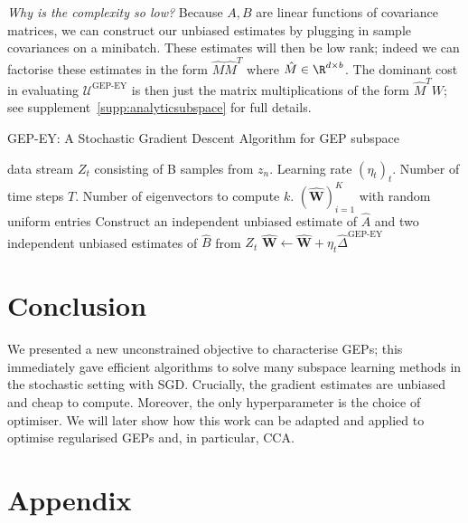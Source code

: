 \textit{Why is the complexity so low?} Because $A,B$ are linear functions of covariance matrices, we can construct our unbiased estimates by plugging in sample covariances on a minibatch.
These estimates will then be low rank; indeed we can factorise these estimates in the form $\hat{M} \hat{M}^T$ where $\hat{M} \in \R^{d \times b}$. The dominant cost in evaluating $\mathcal{U}^\text{GEP-EY}$ is then just the matrix multiplications of the form $\hat{M}^T W$; see supplement~\ref{supp:analyticsubspace} for full details.

\begin{algorithm}
    \caption{GEP-EY: A Stochastic Gradient Descent Algorithm for GEP subspace}
    \label{alg:Delta}
    \begin{algorithmic}
         data stream $Z_t$ consisting of B samples from $z_n$. Learning rate $(\eta_t)_t$. Number of time steps $T$. Number of eigenvectors to compute $k$.
         $(\hat{\mathbf {W}})_{i=1}^K$ with random uniform entries
        \STATE Construct an independent unbiased estimate of $\hat{A}$ and two independent unbiased estimates of $\hat{B}$ from $Z_t$
        \STATE $\hat{\mathbf {W}} \leftarrow \hat{\mathbf {W}}+\eta_{t} \hat{\Delta}^{\text{GEP-EY}}$
        \ENDFOR
    \end{algorithmic}
\end{algorithm}


\section{Conclusion}

We presented a new unconstrained objective to characterise GEPs; this immediately gave efficient algorithms to solve many subspace learning methods in the stochastic setting with SGD.
Crucially, the gradient estimates are unbiased and cheap to compute.
Moreover, the only hyperparameter is the choice of optimiser.
We will later show how this work can be adapted and applied to optimise regularised GEPs and, in particular, CCA.

\appendix

\section{Appendix}